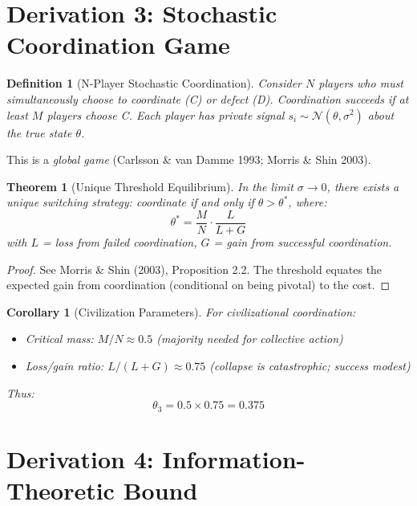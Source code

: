 \documentclass[11pt]{article}
\newtheorem{theorem}{Theorem}
\newtheorem{corollary}{Corollary}
\newtheorem{definition}{Definition}
\begin{document}
\section{Derivation 3: Stochastic Coordination Game}

\begin{definition}[N-Player Stochastic Coordination]
Consider $N$ players who must simultaneously choose to coordinate (C) or defect (D). Coordination succeeds if at least $M$ players choose C. Each player has private signal $s_i \sim \mathcal{N}(\theta, \sigma^2)$ about the true state $\theta$.
\end{definition}

This is a \emph{global game} (Carlsson \& van Damme 1993; Morris \& Shin 2003).

\begin{theorem}[Unique Threshold Equilibrium]
In the limit $\sigma \to 0$, there exists a unique switching strategy: coordinate if and only if $\theta > \theta^*$, where:
\begin{equation}
\theta^* = \frac{M}{N} \cdot \frac{L}{L + G}
\end{equation}
with $L$ = loss from failed coordination, $G$ = gain from successful coordination.
\end{theorem}

\begin{proof}
See Morris \& Shin (2003), Proposition 2.2. The threshold equates the expected gain from coordination (conditional on being pivotal) to the cost.
\end{proof}

\begin{corollary}[Civilization Parameters]
For civilizational coordination:
\begin{itemize}
\item Critical mass: $M/N \approx 0.5$ (majority needed for collective action)
\item Loss/gain ratio: $L/(L+G) \approx 0.75$ (collapse is catastrophic; success modest)
\end{itemize}
Thus:
\begin{equation}
\theta_3 = 0.5 \times 0.75 = \mathbf{0.375}
\end{equation}
\end{corollary}

\section{Derivation 4: Information-Theoretic Bound}
\end{document}
